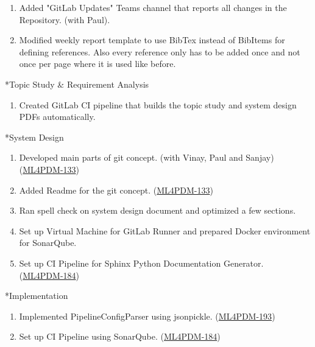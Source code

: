\documentclass[11pt,a4paper]{article}
\begin{document}
\begin{section}
\begin{subsection}
\begin{enumerate}
\begin{enumerate}
           \end{enumerate}
     \item
           Added "GitLab Updates" Teams channel that reports all changes in the Repository. (with Paul).
     \item
           Modified weekly report template to use BibTex instead of BibItems for defining references. Also every reference only has to be added once and not once per page where it is used like before.
   \end{enumerate}
 \end{subsection}
 \begin{subsection}*{Topic Study \& Requirement Analysis}
   \begin{enumerate}
     \item
           Created GitLab CI pipeline that builds the topic study and system design PDFs automatically.
   \end{enumerate}
 \end{subsection}
 \begin{subsection}*{System Design}
   \begin{enumerate}
     \item
           Developed main parts of git concept. (with Vinay, Paul and Sanjay)(\href{https://ml4pdm.atlassian.net/browse/ML4PDM-133}{ML4PDM-133})
     \item
           Added Readme for the git concept. (\href{https://ml4pdm.atlassian.net/browse/ML4PDM-133}{ML4PDM-133})
     \item
           Ran spell check on system design document and optimized a few sections.
     \item
           Set up Virtual Machine for GitLab Runner and prepared Docker environment for SonarQube.
     \item
           Set up CI Pipeline for Sphinx Python Documentation Generator.\\(\href{https://ml4pdm.atlassian.net/browse/ML4PDM-184}{ML4PDM-184})
   \end{enumerate}
 \end{subsection}
 \begin{subsection}*{Implementation}
   \begin{enumerate}
     \item
           Implemented PipelineConfigParser using jsonpickle. (\href{https://ml4pdm.atlassian.net/browse/ML4PDM-193}{ML4PDM-193})
     \item
           Set up CI Pipeline using SonarQube. (\href{https://ml4pdm.atlassian.net/browse/ML4PDM-184}{ML4PDM-184})

\end{enumerate}
\end{subsection}
\end{section}
\end{document}

